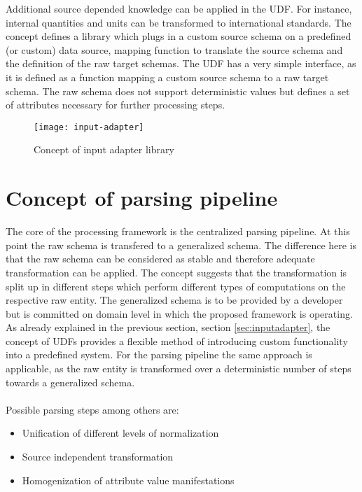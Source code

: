 Additional source depended knowledge can be applied in the UDF. For instance, internal quantities and units can be transformed to international standards. The concept defines a library which plugs in a custom source schema on a predefined (or custom) data source, mapping function to translate the source schema and the definition of the raw target schemas. The UDF has a very simple interface, as it is defined as a function mapping a custom source schema to a raw target schema. The raw schema does not support deterministic values but defines a set of attributes necessary for further processing steps.

\begin{figure}[htb]
  \centering
  \texttt{[image: input-adapter]}\\
  \caption{Concept of input adapter library}
  \label{fig:inputadapter}
\end{figure}

\section{Concept of parsing pipeline}

The core of the processing framework is the centralized parsing pipeline. At this point the raw schema is transfered to a generalized schema. The difference here is that the raw schema can be considered as stable and therefore adequate transformation can be applied. The concept suggests that the transformation is split up in different steps which perform different types of computations on the respective raw entity. The generalized schema is to be provided by a developer but is committed on domain level in which the proposed framework is operating. As already explained in the previous section, section \ref{sec:inputadapter}, the concept of UDFs provides a flexible method of introducing custom functionality into a predefined system. For the parsing pipeline the same approach is applicable, as the raw entity is transformed over a deterministic number of steps towards a generalized schema. 
\\\\
Possible parsing steps among others are:
\begin{itemize}
\item Unification of different levels of normalization
\item Source independent transformation
\item Homogenization of attribute value manifestations
\end{itemize}

